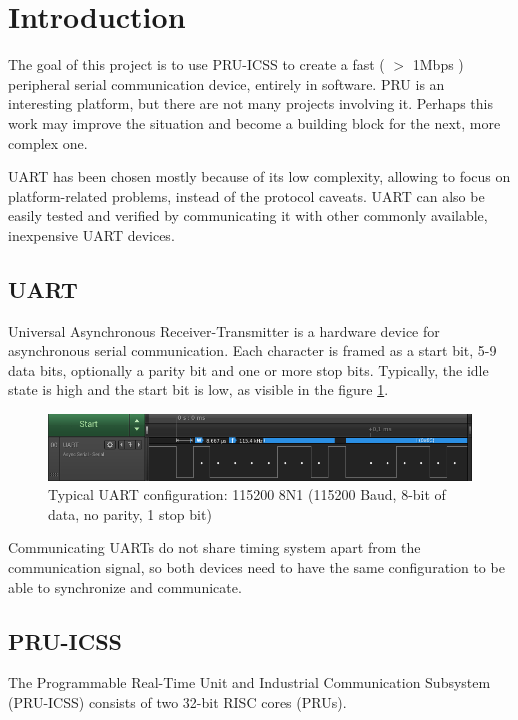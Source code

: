 \documentclass[a4,11pt]{article}
\begin{document}
\section{Introduction}
            The goal of this project is to use PRU-ICSS to create a fast ( $>$ 1Mbps ) peripheral serial communication device, entirely in software. PRU is an interesting platform, but there are not many projects involving it. Perhaps this work may improve the situation and become a building block for the next, more complex one.

            UART has been chosen mostly because of its low complexity, allowing to focus on platform-related problems, instead of the protocol caveats. UART can also be easily tested and verified by communicating it with other commonly available, inexpensive UART devices.

\subsection{UART}
Universal Asynchronous Receiver-Transmitter is a hardware device for asynchronous serial communication.
Each character is framed as a start bit, 5-9 data bits, optionally a parity bit and one or more stop bits.
Typically, the idle state is high and the start bit is low, as visible in the figure \ref{fig:standard}.

\begin{figure}[h]
    \includegraphics[width=\textwidth]{img/standard.png}
    \caption{Typical UART configuration: 115200 8N1 (115200 Baud, 8-bit of data, no parity, 1 stop bit) }
    \label{fig:standard}
\end{figure}

Communicating UARTs do not share timing system apart from the communication signal, so both devices need to have the same configuration to be able to synchronize and communicate.

\subsection{PRU-ICSS}

The Programmable Real-Time Unit and Industrial Communication Subsystem (PRU-ICSS) consists of two
32-bit RISC cores (PRUs).
\end{document}
